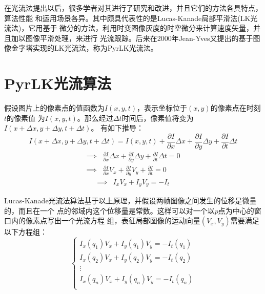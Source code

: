 在光流法提出以后，很多学者对其进行了研究和改进，并且它们的方法各具特点，算法性能
和运用场景各异。其中颇具代表性的是Lucas-Kanade局部平滑法(LK光流法)\cite{lk}，它用基于
微分的方法，利用时变图像灰度的时空微分来计算速度矢量，并且加以图像平滑处理，来进行
光流跟踪。后来在2000年Jean-Yves又提出的基于图像金字塔实现的LK光流法，称为PyrLK光流法\cite{pyrlk}。

\section{PyrLK光流算法}
\label{subsec:pyrlk}
假设图片上的像素点的值函数为$I(x,y,t)$，表示坐标位于$(x,y)$的像素点在时刻$t$的像素值
为$I(x,y,t)$。那么经过$\Delta t$时间后，像素值将变为$I(x+\Delta x,y+\Delta y, t+\Delta t)$。
有如下推导：\\
\[  I(x+\Delta x,y+\Delta y, t+\Delta t)=I(x,y,t) + \frac{\partial I}{\partial x}\Delta x 
		+ \frac{\partial I}{\partial y}\Delta y + \frac{\partial I}{\partial t}\Delta t \]
\begin{displaymath}
	\begin{array}{cc}
		\implies & \frac{\partial I}{\partial x}\Delta x 
		+ \frac{\partial I}{\partial y}\Delta y + \frac{\partial I}{\partial t}\Delta t = 0\\
		\implies & \frac{\partial I}{\partial x}V_x 
		+ \frac{\partial I}{\partial y}V_y + \frac{\partial I}{\partial t} = 0 
	\end{array}
\end{displaymath}
\begin{equation}\label{eq:opticalflow}
	\begin{array}{cc}
				\implies & I_xV_x + I_yV_y = -I_t
	\end{array}
\end{equation}

Lucas-Kanade光流法算法基于以上原理，并假设两帧图像之间发生的位移是微量的，而且在一个
点的邻域内这个位移量是常数。这样可以对一个以$p$点为中心的窗口内的像素点写出一个光流方程
组，表征局部图像的运动向量$(V_x,V_y)$需要满足以下方程组：\\
\begin{equation}
	\left\{
		\begin{array}{c}
			I_x(q_1)V_x + I_y(q_1)V_y = -I_t(q_1)\\
			I_x(q_2)V_x + I_y(q_2)V_y = -I_t(q_2)\\
			\vdots\\
			I_x(q_n)V_x + I_y(q_n)V_y = -I_t(q_n)\\
		\end{array}
	\right.
\end{equation}

